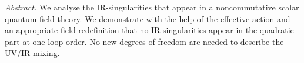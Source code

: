 \documentclass[a4paper,12pt]{article}
\begin{document}
\begin{titlepage}
\begin{center}



       
\end{center} 
\thispagestyle{empty}
\begin{center}
\begin{minipage}{12cm}

\vspace{10mm}

{\it Abstract.}   We analyse the IR-singularities that appear in a noncommutative scalar quantum field theory. We demonstrate with the help of the effective action and an appropriate field redefinition that no IR-singularities appear in the quadratic part at one-loop order. No new degrees of freedom are needed to describe the UV/IR-mixing.

\end{minipage}\end{center}
\end{titlepage}
\end{document}
